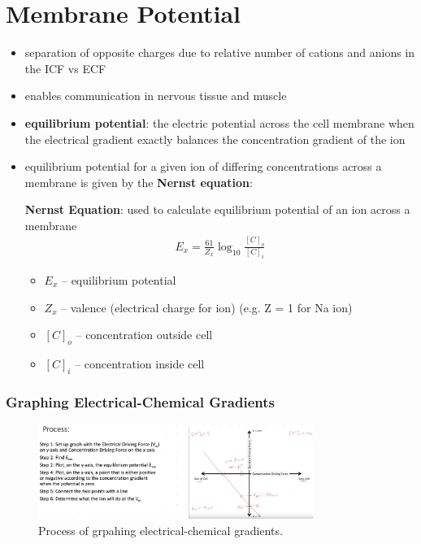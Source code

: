 \documentclass[10pt]{article}
\begin{document}
\section{Membrane Potential}
\begin{itemize}
    \item separation of opposite charges due to relative number of cations and anions in the ICF vs ECF
    \item enables communication in nervous tissue and muscle
    \item \textbf{equilibrium potential}: the electric potential across the cell membrane when the electrical gradient exactly balances the concentration gradient of the ion
    \item equilibrium potential for a given ion of differing concentrations across a membrane is given by the \textbf{Nernst equation}:
        \begin{theorem}
            \textbf{Nernst Equation}: used to calculate equilibrium potential of an ion across a membrane
            \begin{align*}
                E_x = \frac{61}{Z_x} \log_{10} \frac{[C]_o}{[C]_i}
            \end{align*}
            \begin{itemize}
                \item $E_x$ -- equilibrium potential
                \item $Z_x$ -- valence (electrical charge for ion) (e.g. Z = 1 for Na ion)
                \item $[C]_o$ -- concentration outside cell
                \item $[C]_i$ -- concentration inside cell
            \end{itemize}
        \end{theorem}
\end{itemize}

\subsubsection*{Graphing Electrical-Chemical Gradients}
\begin{figure}[h]
    \centering
    \includegraphics[width=0.8\textwidth]{graphingElecChemGradients}
    \caption{Process of grpahing electrical-chemical gradients.}
    \label{fig:graphingElecChemGradients}
\end{figure}
\end{document}
